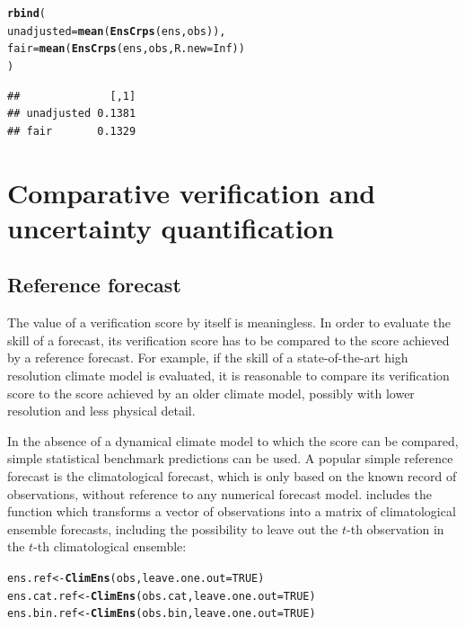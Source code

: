 \documentclass[article]{jss}\usepackage{graphicx, color}
\makeatletter
\newcommand{\hlfunctioncall}[1]{\textcolor[rgb]{0,0.501960784313725,0.752941176470588}{\textbf{#1}}}%
\newenvironment{kframe}{%
 \def\at@end@of@kframe{}%
 \ifinner\ifhmode%
  \def\at@end@of@kframe{\end{minipage}}%
  \begin{minipage}{\columnwidth}%
 \fi\fi%
 \def\FrameCommand##1{\hskip\@totalleftmargin \hskip-\fboxsep
 \colorbox{shadecolor}{##1}\hskip-\fboxsep
     \hskip-\linewidth \hskip-\@totalleftmargin \hskip\columnwidth}%
 \MakeFramed {\advance\hsize-\width
   \@totalleftmargin\z@ \linewidth\hsize
   \@setminipage}}%
 {\par\unskip\endMakeFramed%
 \at@end@of@kframe}
\newenvironment{knitrout}{}{} %
\makeatother
\begin{document}
\begin{knitrout}
\color{fgcolor}\begin{kframe}
\begin{alltt}
\hlfunctioncall{rbind}(
  unadjusted = \hlfunctioncall{mean}(\hlfunctioncall{EnsCrps}(ens, obs)), 
  fair       = \hlfunctioncall{mean}(\hlfunctioncall{EnsCrps}(ens, obs, R.new=Inf))
)
\end{alltt}
\begin{verbatim}
##              [,1]
## unadjusted 0.1381
## fair       0.1329
\end{verbatim}
\end{kframe}
\end{knitrout}





\section{Comparative verification and uncertainty quantification}


\subsection{Reference forecast}

The value of a verification score by itself is meaningless.
In order to evaluate the skill of a forecast, its verification score has to be compared to the score achieved by a reference forecast.
For example, if the skill of a state-of-the-art high resolution climate model is evaluated, it is reasonable to compare its verification score to the score achieved by an older climate model, possibly with lower resolution and less physical detail.

In the absence of a dynamical climate model to which the score can be compared, simple statistical benchmark predictions can be used.
A popular simple reference forecast is the climatological forecast, which is only based on the known record of observations, without reference to any numerical forecast model.
 includes the function  which transforms a vector of observations into a matrix of climatological ensemble forecasts, including the possibility to leave out the $t$-th observation in the $t$-th climatological ensemble:

\begin{knitrout}
\color{fgcolor}\begin{kframe}
\begin{alltt}
ens.ref     <- \hlfunctioncall{ClimEns}(obs,     leave.one.out=TRUE)
ens.cat.ref <- \hlfunctioncall{ClimEns}(obs.cat, leave.one.out=TRUE)
ens.bin.ref <- \hlfunctioncall{ClimEns}(obs.bin, leave.one.out=TRUE)
\end{alltt}
\end{kframe}
\end{knitrout}
\end{document}

